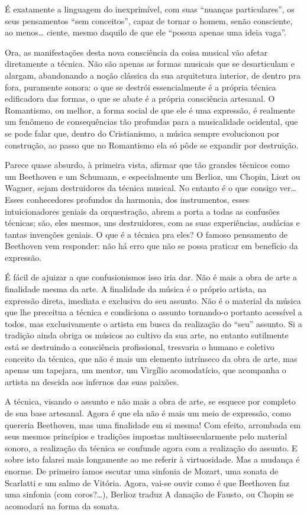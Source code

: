 É exatamente a linguagem do inexprimível, com suas ``nuanças
particulares'', os seus pensamentos ``sem conceitos'', capaz de tornar o
homem, senão consciente, ao menos\ldots{} ciente, mesmo daquilo de que ele
``possua apenas uma ideia vaga''.

Ora, as manifestações desta nova consciência da coisa musical vão afetar
diretamente a técnica. Não são apenas as formas musicais que se
desarticulam e alargam, abandonando a noção clássica da sua arquitetura
interior, de dentro pra fora, puramente sonora: o que se destrói
essencialmente é a própria técnica edificadora das formas, o que se
abate é a própria consciência artesanal. O Romantismo, ou melhor, a
forma social de que ele é uma expressão, é realmente um fenômeno de
consequências tão profundas para a musicalidade ocidental, que se pode
falar que, dentro do Cristianismo, a música sempre evolucionou por
construção, ao passo que no Romantismo ela só pôde se expandir por
destruição.

Parece quase absurdo, à primeira vista, afirmar que tão grandes técnicos
como um Beethoven e um Schumann, e especialmente um Berlioz, um Chopin,
Liszt ou Wagner, sejam destruidores da técnica musical. No entanto é o
que consigo ver\ldots{} Esses conhecedores profundos da harmonia, dos
instrumentos, esses intuicionadores geniais da orquestração, abrem a
porta a todas as confusões técnicas; são, eles mesmos, uns destruidores,
com as suas experiências, audácias e tantas invenções geniais. O que é a
técnica pra eles? O famoso pensamento de Beethoven vem responder: não há
erro que não se possa praticar em benefício da expressão.

É fácil de ajuizar a que confusionismos isso iria dar. Não é mais a obra
de arte a finalidade mesma da arte. A finalidade da música é o próprio
artista, na expressão direta, imediata e exclusiva do seu assunto. Não é
o material da música que lhe preceitua a técnica e condiciona o assunto
tornando-o portanto acessível a todos, mas exclusivamente o artista em
busca da realização do ``seu'' assunto. Si a tradição ainda obriga os
músicos ao cultivo da sua arte, no entanto sutilmente está se destruindo
a consciência profissional, tresvaria o humano e coletivo conceito da
técnica, que não é mais um elemento intrínseco da obra de arte, mas
apenas um tapejara, um mentor, um Virgílio acomodatício, que acompanha o
artista na descida aos infernos das suas paixões.

A técnica, visando o assunto e não mais a obra de arte, se esquece por
completo de sua base artesanal. Agora é que ela não é mais um meio de
expressão, como quereria Beethoven, mas uma finalidade em si mesma! Com
efeito, arrombada em seus mesmos princípios e tradições impostas
multissecularmente pelo material sonoro, a realização da técnica se
confunde agora com a realização do assunto. E sobre isto falarei mais
longamente ao me referir à virtuosidade. Mas a mudança é enorme. De
primeiro íamos escutar uma sinfonia de Mozart, uma sonata de Scarlatti e
um salmo de Vitória. Agora, vai-se ouvir como é que Beethoven faz uma
sinfonia (com coros?\ldots{}), Berlioz traduz A danação de Fausto, ou Chopin
se acomodará na forma da sonata.

